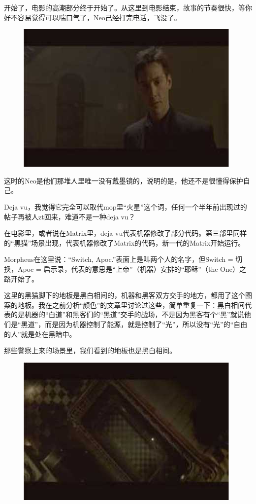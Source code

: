 \documentclass{ctexart}
\begin{document}
开始了，电影的高潮部分终于开始了。从这里到电影结束，故事的节奏很快，等你好不容易觉得可以喘口气了，Neo己经打完电话，飞没了。

\begin{figure}[htb]
\centering
\includegraphics[width=0.5\linewidth]{fig/read_Matrix-52}
\end{figure}

这时的Neo是他们那堆人里唯一没有戴墨镜的，说明的是，他还不是很懂得保护自己。

Deja vu，我觉得它完全可以取代mop里“火星”这个词，任何一个半年前出现过的帖子再被人zt回来，难道不是一种deja vu？

在电影里，或者说在Matrix里，deja vu代表机器修改了部分代码。第三部里同样的“黑猫”场景出现，代表机器修改了Matrix的代码，新一代的Matrix开始运行。

Morpheus在这里说：“Switch, Apoc.”表面上是叫两个人的名字，但Switch = 切换，Apoc = 启示录，代表的意思是“上帝”（机器）安排的“耶稣”（the One）之路开始了。

这里的黑猫脚下的地板是黑白相间的，机器和黑客双方交手的地方，都用了这个图案的地板。我在之前分析“颜色”的文章里讨论过这些，简单重复一下：黑白相间代表的是机器的“白道”和黑客们的“黑道”交手的战场，不是因为黑客有个“黑”就说他们是“黑道”，而是因为机器控制了能源，就是控制了“光”，所以没有“光”的“自由的人”就是处在黑暗中。

那些警察上来的场景里，我们看到的地板也是黑白相间。

\begin{figure}[htb]
\centering
\includegraphics[width=0.5\linewidth]{fig/read_Matrix-54}
\end{figure}
\end{document}
